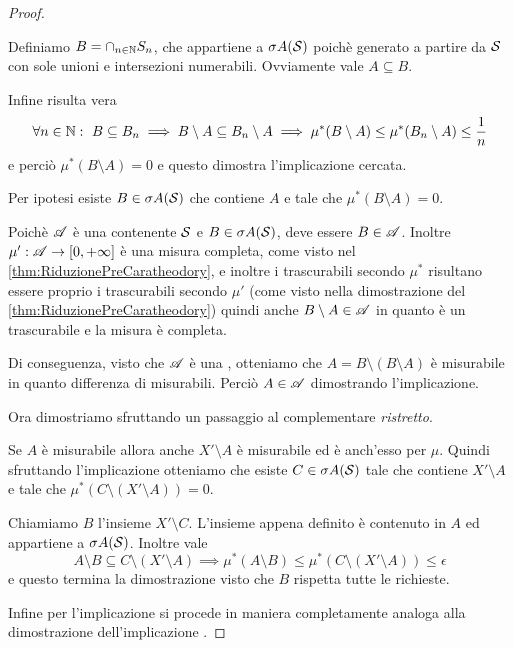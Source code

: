 \begin{proof}
\begin{description}
		Definiamo $B=\cap_{n\in\N}S_n$, che appartiene a $\sigma A(\S)$ poichè generato a partire da $\S$ con sole unioni e intersezioni numerabili. Ovviamente vale $A\subseteq B$.
		
		Infine risulta vera 
		\begin{equation*}
			\forall n\in\N:\ B\subseteq B_n\implies B\setminus A\subseteq B_n\setminus A\implies \mu^*(B\setminus A)\le \mu^*(B_n\setminus A)\le \frac1n
		\end{equation*}
		e perciò $\mu^*(B\setminus A)=0$ e questo dimostra l'implicazione cercata.
		\item[\ImplicationProof{it:SigmaDaFuoriEquivalenze}{it:MisurabileEquivalenze}] Per ipotesi esiste $B\in\sigma A(\S)$ che contiene $A$ e tale che $\mu^*(B\setminus A)=0$.
		
		Poichè $\A$ è una \sigalg{} contenente $\S$ e $B\in\sigma A(\S)$, deve essere $B\in\A$. 
		Inoltre $\mu':\A\to\Rpiu$ è una misura completa, come visto nel \cref{thm:RiduzionePreCaratheodory}, e inoltre i trascurabili secondo $\mu^*$ risultano essere proprio i trascurabili secondo $\mu'$ (come visto nella dimostrazione del \cref{thm:RiduzionePreCaratheodory}) quindi anche $B\setminus A\in \A$ in quanto è un trascurabile e la misura è completa. 
		
		Di conseguenza, visto che $\A$ è una \sigalg, otteniamo che $A=B\setminus (B\setminus A)$ è misurabile in quanto differenza di misurabili. Perciò $A\in\A$ dimostrando l'implicazione.
	\end{description}
	
	Ora dimostriamo  sfruttando un passaggio al complementare \emph{ristretto}.
	
	Se $A$ è misurabile allora anche $X'\setminus A$ è misurabile ed è anch'esso \sigfin[o] per $\mu$. Quindi sfruttando l'implicazione  otteniamo che esiste $C\in\sigma A(\S)$ tale che contiene $X'\setminus A$ e tale che $\mu^*(C\setminus(X'\setminus A))=0$. 
	
	Chiamiamo $B$ l'insieme $X'\setminus C$. L'insieme appena definito è contenuto in $A$ ed appartiene a $\sigma A(\S)$. Inoltre vale
	\begin{equation*}
		A\setminus B\subseteq C\setminus (X'\setminus A) \implies \mu^*(A\setminus B)\le \mu^*\left(C\setminus(X'\setminus A)\right)\le \epsilon
	\end{equation*}
	e questo termina la dimostrazione visto che $B$ rispetta tutte le richieste.
	
	Infine per l'implicazione  si procede in maniera completamente analoga alla dimostrazione dell'implicazione .
\end{proof}

